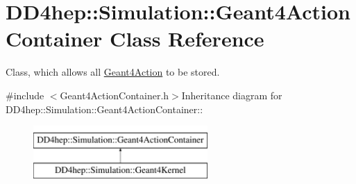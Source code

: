 \hypertarget{class_d_d4hep_1_1_simulation_1_1_geant4_action_container}{
\section{DD4hep::Simulation::Geant4ActionContainer Class Reference}
\label{class_d_d4hep_1_1_simulation_1_1_geant4_action_container}
}


Class, which allows all \hyperlink{class_d_d4hep_1_1_simulation_1_1_geant4_action}{Geant4Action} to be stored.  


{\ttfamily \#include $<$Geant4ActionContainer.h$>$}Inheritance diagram for DD4hep::Simulation::Geant4ActionContainer::\begin{figure}[H]
\begin{center}
\leavevmode
\includegraphics[height=2cm]{class_d_d4hep_1_1_simulation_1_1_geant4_action_container}
\end{center}
\end{figure}
